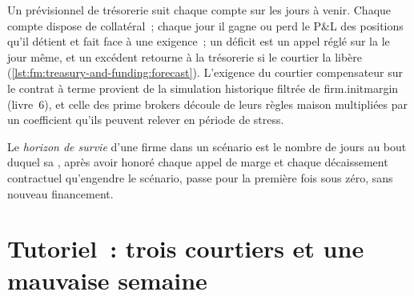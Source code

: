 Un prévisionnel de trésorerie suit chaque compte sur les jours à venir. Chaque compte dispose de collatéral~; chaque jour il gagne ou perd le P\&L des positions
qu'il détient et fait face à une exigence~; un déficit est un appel réglé sur la  le jour même, et un excédent retourne à la trésorerie si le courtier
la libère (\cref{lst:fm:treasury-and-funding:forecast}). L'exigence du courtier compensateur sur le contrat à terme provient de la simulation historique filtrée de firm.initmargin
(livre~6), et celle des prime brokers découle de leurs règles maison multipliées par un coefficient qu'ils peuvent relever en période de stress.

\label{lst:fm:treasury-and-funding:forecast}

\begin{definition}\label{def:fm:treasury-and-funding:horizon}
Le \emph{horizon de survie} d'une firme dans un scénario est le nombre de jours au bout duquel sa , après avoir honoré
chaque appel de marge et chaque décaissement contractuel qu'engendre le scénario, passe pour la première fois sous zéro, sans nouveau financement.
\end{definition}

\section{Tutoriel~: trois courtiers et une mauvaise semaine}\label{tut:fm:treasury-and-funding:tut}

